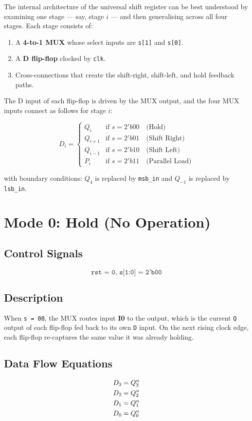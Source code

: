 \documentclass[12pt,a4paper]{report}
\newcommand{\signal}[1]{\texttt{\textcolor{codeblue}{#1}}}
\begin{document}
The internal architecture of the universal shift register can be best understood by examining one stage — say, stage $i$ — and then generalising across all four stages. Each stage consists of:
\begin{enumerate}
    \item A \textbf{4-to-1 MUX} whose select inputs are \signal{s[1]} and \signal{s[0]}.
    \item A \textbf{D flip-flop} clocked by \signal{clk}.
    \item Cross-connections that create the shift-right, shift-left, and hold feedback paths.
\end{enumerate}

The D input of each flip-flop is driven by the MUX output, and the four MUX inputs connect as follows for stage $i$:

\[
D_i = \begin{cases}
Q_i & \text{if } s = 2'b00 \quad \text{(Hold)} \\
Q_{i+1} & \text{if } s = 2'b01 \quad \text{(Shift Right)} \\
Q_{i-1} & \text{if } s = 2'b10 \quad \text{(Shift Left)} \\
P_i & \text{if } s = 2'b11 \quad \text{(Parallel Load)}
\end{cases}
\]

with boundary conditions: $Q_4$ is replaced by \signal{msb\_in} and $Q_{-1}$ is replaced by \signal{lsb\_in}.

\section{Mode 0: Hold (No Operation)}

\subsection{Control Signals}
\[\texttt{rst = 0, s[1:0] = 2'b00}\]

\subsection{Description}
When \signal{s = 00}, the MUX routes input \textbf{I0} to the output, which is the current \signal{Q} output of each flip-flop fed back to its own \signal{D} input. On the next rising clock edge, each flip-flop re-captures the same value it was already holding.

\subsection{Data Flow Equations}
\begin{align}
    D_3 &= Q_3^n \notag \\
    D_2 &= Q_2^n \notag \\
    D_1 &= Q_1^n \notag \\
    D_0 &= Q_0^n \notag
\end{align}
\end{document}
